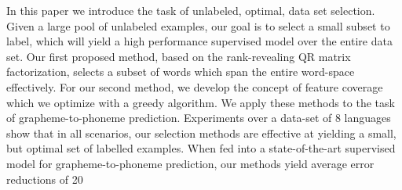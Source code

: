 In this paper we introduce the task of unlabeled, optimal, data set     selection. Given a large pool of unlabeled examples, our goal is to select
     a small subset to label, which will yield a high performance supervised
     model over the entire data set. Our first proposed method, based on the
     rank-revealing QR matrix factorization, selects a subset of words which
     span the entire word-space effectively.  For our second method, we develop
     the concept of feature coverage which we optimize with a greedy algorithm. 
 We
     apply these methods to the task of grapheme-to-phoneme prediction.
     Experiments over a data-set of 8 languages show that in all scenarios,
     our selection methods are effective at yielding a small, but
     optimal set of labelled examples.  When fed into a state-of-the-art
     supervised model for grapheme-to-phoneme prediction, our methods yield
     average error reductions of 20\\%

